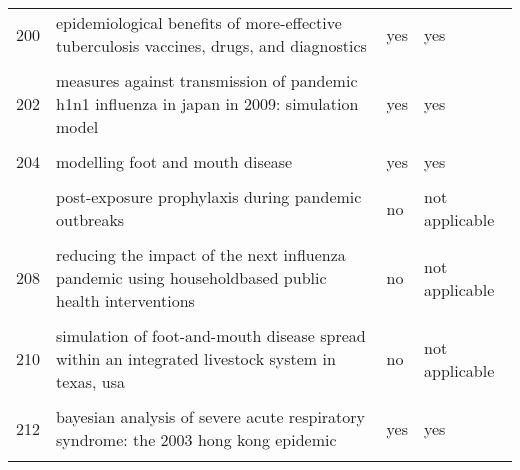 \documentclass[
]{article}
\begin{document}
\begin{landscape}
\begin{longtable}{l>{\raggedright\arraybackslash}p{9cm}ll}
200 & epidemiological benefits of more-effective tuberculosis vaccines, drugs, and diagnostics & yes & yes\\
\addlinespace
\cellcolor{gray!6}{201} & \cellcolor{gray!6}{household epidemics: modelling effects of early stage vaccination} & \cellcolor{gray!6}{yes} & \cellcolor{gray!6}{yes}\\
202 & measures against transmission of pandemic h1n1 influenza in japan in 2009: simulation model & yes & yes\\
\cellcolor{gray!6}{203} & \cellcolor{gray!6}{modeling vaccination campaigns and the fall/winter 2009 activity of the new a(h1n1) influenza in the northern hemisphere} & \cellcolor{gray!6}{yes} & \cellcolor{gray!6}{no}\\
204 & modelling foot and mouth disease & yes & yes\\
\cellcolor{gray!6}{205} & \cellcolor{gray!6}{modelling of the influenza a(h1n1)v outbreak in mexico city, april-may 2009, with control sanitary measures} & \cellcolor{gray!6}{no} & \cellcolor{gray!6}{not applicable}\\
\addlinespace
206 & post-exposure prophylaxis during pandemic outbreaks & no & not applicable\\
\cellcolor{gray!6}{207} & \cellcolor{gray!6}{potential for a global dynamic of influenza a (h1n1)} & \cellcolor{gray!6}{no} & \cellcolor{gray!6}{not applicable}\\
208 & reducing the impact of the next influenza pandemic using householdbased public health interventions & no & not applicable\\
\cellcolor{gray!6}{209} & \cellcolor{gray!6}{seasonal transmission potential and activity peaks of the new influenza a(h1n1): a monte carlo likelihood analysis based on human mobility} & \cellcolor{gray!6}{yes} & \cellcolor{gray!6}{no}\\
210 & simulation of foot-and-mouth disease spread within an integrated livestock system in texas, usa & no & not applicable\\
\addlinespace
\cellcolor{gray!6}{211} & \cellcolor{gray!6}{the transmissibility and control of pandemic influenza a (h1n1) virus} & \cellcolor{gray!6}{yes} & \cellcolor{gray!6}{no}\\
212 & bayesian analysis of severe acute respiratory syndrome: the 2003 hong kong epidemic & yes & yes\\
\cellcolor{gray!6}{213} & \cellcolor{gray!6}{hepatitis b vaccination and changes in sexual risk behaviour among men who have sex with men in amsterdam} & \cellcolor{gray!6}{no} & \cellcolor{gray!6}{not applicable}\\

\end{longtable}
\end{landscape}
\end{document}
